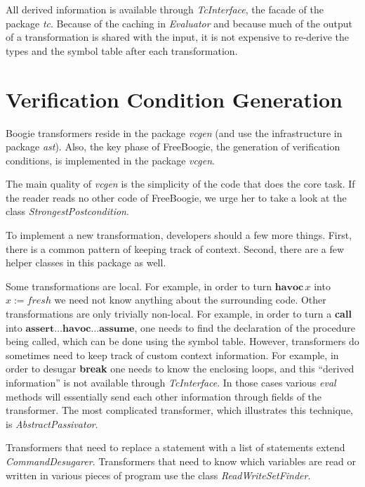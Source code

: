 \documentclass{llncs}
\begin{document}
All derived information is available through \textit{TcInterface}, the
facade of the package \textit{tc}.  Because of the caching in
\textit{Evaluator} and because much of the output of a transformation is
shared with the input, it is not expensive to re-derive the types and the
symbol table after each transformation.

\section{Verification Condition Generation} %

Boogie transformers reside in the package \textit{vcgen} (and use the
infrastructure in package \textit{ast}). Also, the key phase of FreeBoogie,
the generation of verification conditions, is implemented in the package
\textit{vcgen}.

The main quality of \textit{vcgen} is the simplicity of the code that does
the core task. If the reader reads no other code of FreeBoogie, we urge her
to take a look at the class \textit{StrongestPostcondition}.

To implement a new transformation, developers should a few more things.
First, there is a common pattern of keeping track of context. Second, there
are a few helper classes in this package as well.

Some transformations are local. For example, in order to turn
$\mathbf{havoc}\,x$ into $x:=\mathit{fresh}$ we need not know anything
about the surrounding code. Other transformations are only trivially
non-local. For example, in order to turn a \textbf{call} into
$\mathbf{assert}\ldots\mathbf{havoc}\ldots\mathbf{assume}$, one needs to
find the declaration of the procedure being called, which can be done using
the symbol table. However, transformers do sometimes need to keep track of
custom context information. For example, in order to desugar \textbf{break}
one needs to know the enclosing loops, and this ``derived information'' is
not available through \textit{TcInterface}. In those cases various
\textit{eval} methods will essentially send each other information through
fields of the transformer. The most complicated transformer, which
illustrates this technique, is \textit{AbstractPassivator}.

Transformers that need to replace a statement with a list of statements
extend \textit{CommandDesugarer}. Transformers that need to know which
variables are read or written in various pieces of program use the class
\textit{ReadWriteSetFinder}.
\end{document}
